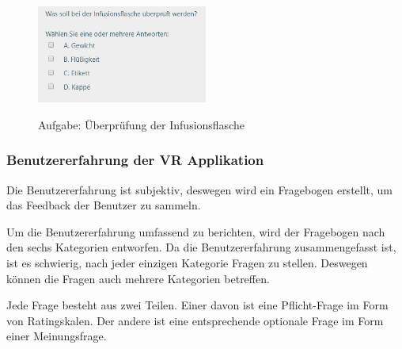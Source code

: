 \begin{enumerate}
\begin{figure}[ht]
\vspace*{1em}
\centering
\caption{Aufgabe: Überprüfung der Infusionsflasche}
\includegraphics[width= 0.5\textwidth]{images/Aufgabe5.png}
\label{fig:Aufgabe5} 
\end{figure}
    
\end{enumerate}

\subsubsection{Benutzererfahrung der VR Applikation}

Die Benutzererfahrung ist subjektiv, deswegen wird ein Fragebogen erstellt, um das Feedback der Benutzer zu sammeln.

Um die Benutzererfahrung umfassend zu berichten, wird der Fragebogen nach den sechs Kategorien \citep{28} entworfen. Da die Benutzererfahrung zusammengefasst ist, ist es schwierig, nach jeder einzigen Kategorie Fragen zu stellen. Deswegen können die Fragen auch mehrere Kategorien betreffen.

Jede Frage besteht aus zwei Teilen. Einer davon ist eine Pflicht-Frage im Form von Ratingskalen. Der andere ist eine entsprechende optionale Frage im Form einer Meinungsfrage.

